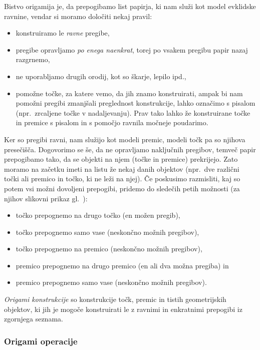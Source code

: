 Bistvo origamija je, da prepogibamo list papirja, ki nam služi kot model evklidske ravnine, vendar si moramo določiti nekaj pravil:
\begin{itemize}
    \item konstruiramo le \emph{ravne} pregibe,
    \item pregibe opravljamo \emph{po enega naenkrat}, torej po vsakem pregibu papir nazaj razgrnemo,
    \item ne uporabljamo drugih orodij, kot so škarje, lepilo ipd.,
    \item pomožne točke, za katere vemo, da jih znamo konstruirati, ampak bi nam pomožni pregibi zmanjšali preglednost konstrukcije, lahko označimo s pisalom (npr.\ zrcaljene točke v nadaljevanju). Prav tako lahko že konstruirane točke in premice s pisalom in s pomočjo ravnila močneje poudarimo.
\end{itemize}
Ker so pregibi ravni, nam služijo kot modeli premic, modeli točk pa so njihova presečišča. Dogovorimo se še, da ne opravljamo naključnih pregibov, temveč papir prepogibamo tako, da se objekti na njem (točke in premice) prekrijejo. Zato moramo na začetku imeti na listu že nekaj danih objektov (npr.\ dve različni točki ali premico in točko, ki ne leži na njej). Če poskusimo razmisliti, kaj so potem vsi možni dovoljeni prepogibi, pridemo do sledečih petih možnosti (za njihov slikovni prikaz gl.\ \cite[str.\ 25--26]{hull2020}):
\begin{itemize}
    \item točko prepognemo na drugo točko (en možen pregib),
    \item točko prepognemo samo vase (neskončno možnih pregibov),
    \item točko prepognemo na premico (neskončno možnih pregibov),
    \item premico prepognemo na drugo premico (en ali dva možna pregiba) in
    \item premico prepognemo samo vase (neskončno možnih pregibov).
\end{itemize}

\begin{definicija}
    \label{def:origami_konstruktibilnost}
    \emph{Origami konstrukcije} so konstrukcije točk, premic in tistih geometrijskih objektov, ki jih je mogoče konstruirati le z ravnimi in enkratnimi prepogibi iz zgornjega seznama.
\end{definicija}

\subsubsection{Origami operacije}
\label{podpodpogl:operacije}

